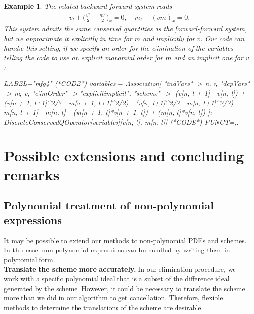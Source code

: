 \documentclass[manuscript]{acmart}
\newcommand{\1}{{\chi}}
\numberwithin{equation}{section}
\theoremstyle{thmlemcorr}
\numberwithin{theorem}{section}
\theoremstyle{thmlemcorr*}
\theoremstyle{defi}
\theoremstyle{remexample}
\newtheorem{example}[theorem]{Example}
\theoremstyle{ass}
\begin{document}
\begin{example}
	The related backward-forward system reads
	\begin{gather*}
		-v_t+\Big(\frac{v^2}{2}-\frac{m^2}{2}\Big)_x=0,\quad
		m_t-(vm)_x=0.
	\end{gather*}
	This system admits the same conserved quantities as the forward-forward system, but we approximate it explicitly in time for $m$ and implicitly for $v$. Our code can handle this setting, if we specify an order for the elimination of the variables, telling the code to use an explicit monomial order for $m$ and an implicit one for $v$:
	\begin{EXE}
		LABEL="mfg4"
		(*CODE*)
		variables = Association[
		"indVars" -> {n, t},
		"depVars" -> {m, v},
		"elimOrder" -> "explicitimplicit",
		"scheme" -> {-(v[n, t + 1] - 
			v[n, t]) + (v[n + 1, t+1]^2/2 - m[n + 1, t+1]^2/2) - (v[n, t+1]^2/2 - 
			m[n, t+1]^2/2), 
			m[n, t + 1] - 
			m[n, t] - (m[n + 1, t]*v[n + 1, t]) + (m[n, t]*v[n, t])}
		];
		DiscreteConservedQOperator[variables][{v[n, t], m[n, t]}]
		(*CODE*)
		PUNCT={,.}
	\end{EXE}
	\begin{small}
		
		
	\end{small}
\end{example}
\section{Possible extensions and concluding remarks}
\subsection{ Polynomial treatment of non-polynomial expressions}
It may be possible to extend our methods to non-polynomial PDEs and schemes. In this case, non-polynomial expressions can be handled by writing them in polynomial form.\\
{\bf Translate the scheme more accurately.}
In our elimination procedure, we work with a specific polynomial ideal that is a subset of the difference ideal generated by the scheme. However, it could be necessary to translate the scheme more than we did in our algorithm to get cancellation. Therefore, flexible methods to determine the translations of the scheme are desirable.\\
\end{document}
